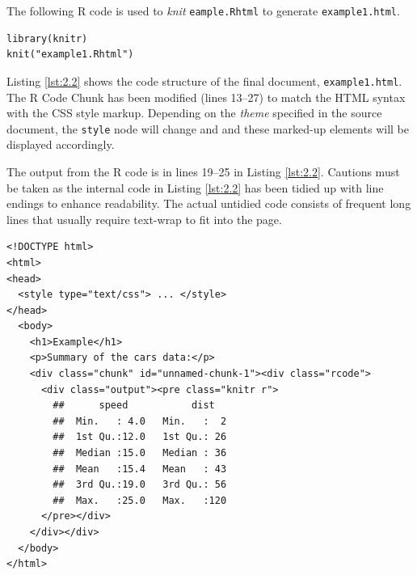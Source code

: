\documentclass[a4paper, 12pt]{report}
\begin{document}
The following R code is used to \emph{knit} \texttt{eample.Rhtml} to generate \texttt{example1.html}.

\begin{lstlisting}[numbers=none]
library(knitr)
knit("example1.Rhtml")
\end{lstlisting}

Listing \ref{lst:2.2} shows the code structure of the final document, \texttt{example1.html}. The R Code Chunk has been modified (lines 13--27) to match the HTML syntax with the CSS style markup. Depending on the \emph{theme} specified in the source document, the \texttt{style} node will change and and these marked-up elements will be displayed accordingly.

The output from the R code is in lines 19--25 in Listing \ref{lst:2.2}. Cautions must be taken as the internal code in Listing \ref{lst:2.2} has been tidied up with line endings to enhance readability. The actual untidied code consists of frequent long lines that usually require text-wrap to fit into the page.

\begin{lstlisting}[caption={(tidied) \texttt{example1.html}}, escapechar=\|, label={lst:2.2}]
<!DOCTYPE html>
<html>
<head>
  <style type="text/css"> ... </style>
</head>
  <body>
    <h1>Example</h1>
    <p>Summary of the cars data:</p>
    <div class="chunk" id="unnamed-chunk-1"><div class="rcode">
      <div class="output"><pre class="knitr r">
        ##      speed           dist    
        ##  Min.   : 4.0   Min.   :  2  
        ##  1st Qu.:12.0   1st Qu.: 26  
        ##  Median :15.0   Median : 36  
        ##  Mean   :15.4   Mean   : 43  
        ##  3rd Qu.:19.0   3rd Qu.: 56  
        ##  Max.   :25.0   Max.   :120
      </pre></div>
    </div></div>
  </body>
</html>
\end{lstlisting}
\end{document}
